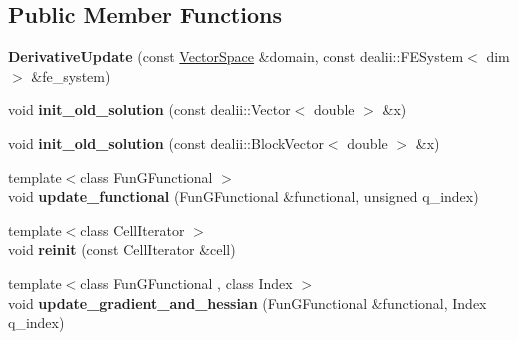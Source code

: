 \subsection*{\-Public \-Member \-Functions}
\begin{DoxyCompactItemize}
\item 
\hypertarget{structSpacy_1_1dealII_1_1Detail_1_1DerivativeUpdate_a5e5875c13ea3b0d21267f69b41360f99}{{\bfseries \-Derivative\-Update} (const \hyperlink{classSpacy_1_1VectorSpace}{\-Vector\-Space} \&domain, const dealii\-::\-F\-E\-System$<$ dim $>$ \&fe\-\_\-system)}\label{structSpacy_1_1dealII_1_1Detail_1_1DerivativeUpdate_a5e5875c13ea3b0d21267f69b41360f99}

\item 
\hypertarget{structSpacy_1_1dealII_1_1Detail_1_1DerivativeUpdate_ae7be444fc13fe4dc1f164ba653d318d9}{void {\bfseries init\-\_\-old\-\_\-solution} (const dealii\-::\-Vector$<$ double $>$ \&x)}\label{structSpacy_1_1dealII_1_1Detail_1_1DerivativeUpdate_ae7be444fc13fe4dc1f164ba653d318d9}

\item 
\hypertarget{structSpacy_1_1dealII_1_1Detail_1_1DerivativeUpdate_a12ebc4571dfcb472a6496f4aec53f1ba}{void {\bfseries init\-\_\-old\-\_\-solution} (const dealii\-::\-Block\-Vector$<$ double $>$ \&x)}\label{structSpacy_1_1dealII_1_1Detail_1_1DerivativeUpdate_a12ebc4571dfcb472a6496f4aec53f1ba}

\item 
\hypertarget{structSpacy_1_1dealII_1_1Detail_1_1DerivativeUpdate_a1e138fc587720c3bb302134902b4a2e9}{{\footnotesize template$<$class Fun\-G\-Functional $>$ }\\void {\bfseries update\-\_\-functional} (\-Fun\-G\-Functional \&functional, unsigned q\-\_\-index)}\label{structSpacy_1_1dealII_1_1Detail_1_1DerivativeUpdate_a1e138fc587720c3bb302134902b4a2e9}

\item 
\hypertarget{structSpacy_1_1dealII_1_1Detail_1_1DerivativeUpdate_a60879d22f8b2e4d9327e4df5866a5d51}{{\footnotesize template$<$class Cell\-Iterator $>$ }\\void {\bfseries reinit} (const \-Cell\-Iterator \&cell)}\label{structSpacy_1_1dealII_1_1Detail_1_1DerivativeUpdate_a60879d22f8b2e4d9327e4df5866a5d51}

\item 
\hypertarget{structSpacy_1_1dealII_1_1Detail_1_1DerivativeUpdate_a8f1ee8a665b9b7c429c8179e501e57a9}{{\footnotesize template$<$class Fun\-G\-Functional , class Index $>$ }\\void {\bfseries update\-\_\-gradient\-\_\-and\-\_\-hessian} (\-Fun\-G\-Functional \&functional, \-Index q\-\_\-index)}\label{structSpacy_1_1dealII_1_1Detail_1_1DerivativeUpdate_a8f1ee8a665b9b7c429c8179e501e57a9}


\end{DoxyCompactItemize}
